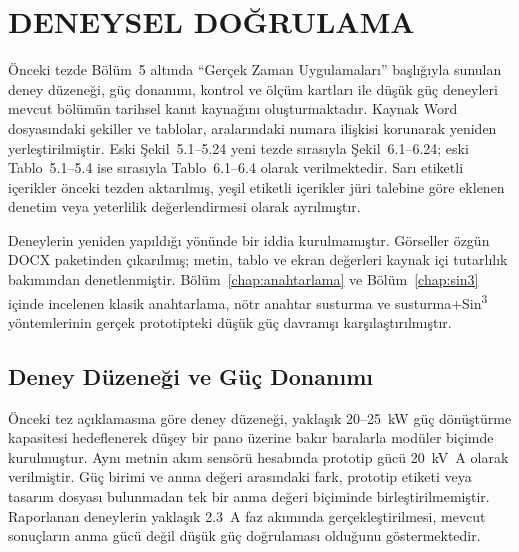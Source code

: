 \chapter{DENEYSEL DOĞRULAMA}
\label{chap:deney}

Önceki tezde Bölüm~5 altında ``Gerçek Zaman Uygulamaları'' başlığıyla sunulan deney düzeneği, güç donanımı, kontrol ve ölçüm kartları ile düşük güç deneyleri mevcut bölümün tarihsel kanıt kaynağını oluşturmaktadır. Kaynak Word dosyasındaki şekiller ve tablolar, aralarındaki numara ilişkisi korunarak yeniden yerleştirilmiştir. Eski Şekil~5.1--5.24 yeni tezde sırasıyla Şekil~6.1--6.24; eski Tablo~5.1--5.4 ise sırasıyla Tablo~6.1--6.4 olarak verilmektedir. Sarı etiketli içerikler önceki tezden aktarılmış, yeşil etiketli içerikler jüri talebine göre eklenen denetim veya yeterlilik değerlendirmesi olarak ayrılmıştır.

Deneylerin yeniden yapıldığı yönünde bir iddia kurulmamıştır. Görseller özgün DOCX paketinden çıkarılmış; metin, tablo ve ekran değerleri kaynak içi tutarlılık bakımından denetlenmiştir. Bölüm~\ref{chap:anahtarlama} ve Bölüm~\ref{chap:sin3} içinde incelenen klasik anahtarlama, nötr anahtar susturma ve susturma+Sin\textsuperscript{3} yöntemlerinin gerçek prototipteki düşük güç davranışı karşılaştırılmıştır.


\section{Deney Düzeneği ve Güç Donanımı}

Önceki tez açıklamasına göre deney düzeneği, yaklaşık 20--25~kW güç dönüştürme kapasitesi hedeflenerek düşey bir pano üzerine bakır baralarla modüler biçimde kurulmuştur. Aynı metnin akım sensörü hesabında prototip gücü \SI{20}{\kilo\volt\ampere} olarak verilmiştir. Güç birimi ve anma değeri arasındaki fark, prototip etiketi veya tasarım dosyası bulunmadan tek bir anma değeri biçiminde birleştirilmemiştir. Raporlanan deneylerin yaklaşık \SI{2.3}{\ampere} faz akımında gerçekleştirilmesi, mevcut sonuçların anma gücü değil düşük güç doğrulaması olduğunu göstermektedir.


